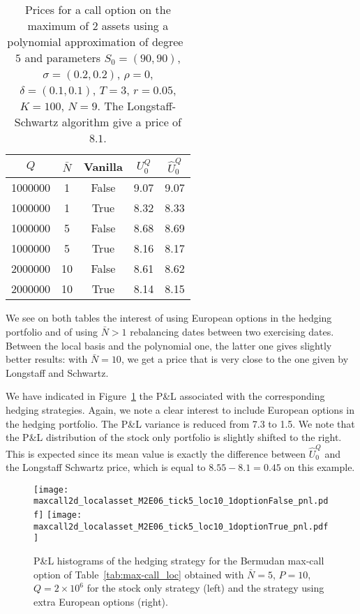 \begin{table}[htb!]
  \centering\begin{tabular}{ccccc}
    \hline
    $Q$ & $\bar{N}$ & Vanilla\phantom{$\Big|$} & $U_0^Q$ & $\hat{U}_0^Q$ \\
    \hline
    1000000 & 1 & False & 9.07 & 9.07 \\
    1000000 & 1 & True & 8.32 & 8.33 \\
    1000000 & 5 & False & 8.68 & 8.69 \\
    1000000 & 5 & True & 8.16 & 8.17 \\
    2000000 & 10 & False & 8.61 & 8.62 \\
    2000000 & 10 & True & 8.14 & 8.15 \\
    \hline
    \end{tabular}
    \caption{Prices for a call option on the maximum of 2 assets using a polynomial approximation of degree~$5$ and parameters $S_0=(90, 90)$, $\sigma=(0.2,0.2)$, $\rho=0$, $\delta=(0.1,0.1)$, $T=3$, $r=0.05$, $K=100$, $N=9$. The Longstaff-Schwartz algorithm give a price of $8.1$.}\label{tab:max-call_pol}
\end{table}

We see on both tables the interest of using European options in the hedging portfolio and of using $\bar{N}>1$ rebalancing dates between two exercising dates. Between the local basis and the polynomial one, the latter one gives slightly better results: with $\bar{N}=10$, we get a price that is very close to the one given by Longstaff and Schwartz.  

We have indicated in Figure~\ref{fig:max-call_loc} the P\&L associated with the corresponding hedging strategies. Again, we note a clear interest to include European options in the hedging portfolio. The P\&L variance is reduced from 7.3 to 1.5. We note that the P\&L distribution of the stock only portfolio is slightly shifted to the right. This is expected since its mean value is exactly the difference between $\hat{U}_0^Q$ and the Longstaff Schwartz price, which is equal to $8.55-8.1=0.45$ on this example.  




\begin{figure}[h!]
  \texttt{[image: maxcall2d\_localasset\_M2E06\_tick5\_loc10\_1doptionFalse\_pnl.pdf]}
  \texttt{[image: maxcall2d\_localasset\_M2E06\_tick5\_loc10\_1doptionTrue\_pnl.pdf]}
  \caption{P\&L histograms of the hedging strategy for the Bermudan max-call option of Table~\ref{tab:max-call_loc} obtained with $\bar{N}=5$, $P=10$, $Q=2\times 10^6$ for the stock only strategy (left) and the strategy using extra European options (right). }\label{fig:max-call_loc}
\end{figure}


